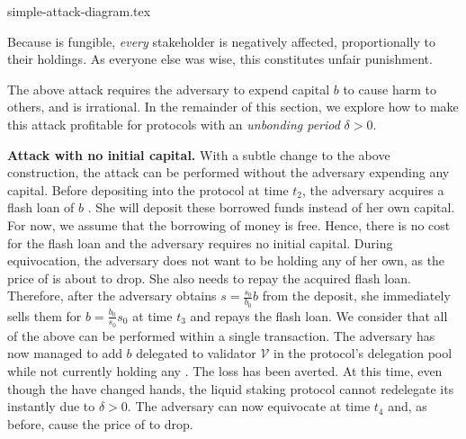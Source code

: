 {simple-attack-diagram.tex}


Because \stasset is fungible, \emph{every} stakeholder is negatively affected,
proportionally to their holdings.
As everyone else was
wise, this constitutes unfair punishment.

The above attack requires the adversary to expend capital $b$ to cause
harm to others, and is irrational. In the remainder of this section, we
explore how to make this attack profitable for protocols with an
\emph{unbonding period} $\delta > 0$.

\noindent
\textbf{Attack with no initial capital.}
With a subtle change to the above construction, the attack can be
performed without the adversary expending any capital.
Before depositing into the protocol at time $t_2$, the
adversary acquires a flash loan of $b$ \asset. She will deposit these
borrowed funds instead of her own capital.
For now, we assume that the borrowing of money is free.
Hence, there is no cost for the flash loan and the adversary
requires no initial capital.
During equivocation, the adversary does not want to be holding any
\stasset of her own, as the price of \stasset is about to drop. She also
needs to repay the acquired flash loan.
Therefore, after the adversary obtains $s = \frac{s_0}{b_0} b$ \stasset
from the deposit, she immediately sells them for $b = \frac{b_0}{s_0} s_0$
\asset at time $t_3$ and repays the flash loan. We consider that all
of the above can be performed within a single transaction.
The adversary has now managed to add $b$ \asset delegated to validator $\mathcal{V}$
in the protocol's delegation pool while not currently holding
any \stasset. The loss has been averted.
At this time, even though the
\stassets have changed hands, the liquid staking protocol cannot redelegate
its \assets instantly due to $\delta > 0$.
The adversary can now equivocate at time $t_4$ and, as before, cause the
price of \stasset to drop.


